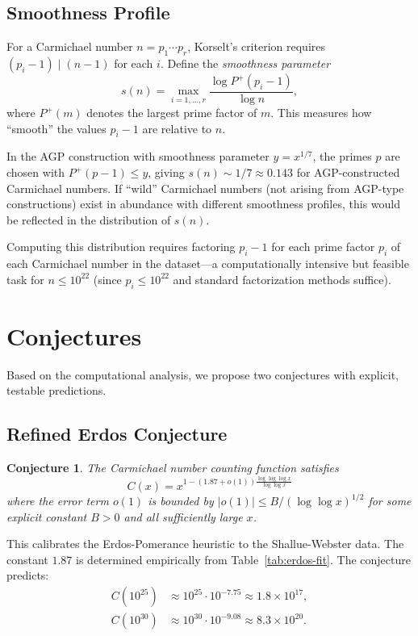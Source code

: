 \documentclass{amsart}
\theoremstyle{plain}
\newtheorem{conjecture}[theorem]{Conjecture}
\theoremstyle{definition}
\theoremstyle{remark}
\begin{document}
\subsection{Smoothness Profile}

For a Carmichael number $n = p_1 \cdots p_r$, Korselt's criterion requires $(p_i - 1) \mid (n-1)$ for each $i$. Define the \emph{smoothness parameter}
\[
s(n) = \max_{i=1,\ldots,r} \frac{\log P^+(p_i - 1)}{\log n},
\]
where $P^+(m)$ denotes the largest prime factor of $m$. This measures how ``smooth'' the values $p_i - 1$ are relative to $n$.

In the AGP construction with smoothness parameter $y = x^{1/7}$, the primes $p$ are chosen with $P^+(p-1) \le y$, giving $s(n) \sim 1/7 \approx 0.143$ for AGP-constructed Carmichael numbers. If ``wild'' Carmichael numbers (not arising from AGP-type constructions) exist in abundance with different smoothness profiles, this would be reflected in the distribution of $s(n)$.

Computing this distribution requires factoring $p_i - 1$ for each prime factor $p_i$ of each Carmichael number in the dataset---a computationally intensive but feasible task for $n \le 10^{22}$ (since $p_i \le 10^{22}$ and standard factorization methods suffice).

\section{Conjectures}\label{sec:conjectures}

Based on the computational analysis, we propose two conjectures with explicit, testable predictions.

\subsection{Refined Erdos Conjecture}

\begin{conjecture}\label{conj:refined-erdos}
The Carmichael number counting function satisfies
\[
C(x) = x^{1 - (1.87 + o(1)) \frac{\log \log \log x}{\log \log x}}
\]
where the error term $o(1)$ is bounded by $|o(1)| \le B / (\log \log x)^{1/2}$ for some explicit constant $B > 0$ and all sufficiently large $x$.
\end{conjecture}

This calibrates the Erdos-Pomerance heuristic to the Shallue-Webster data. The constant $1.87$ is determined empirically from Table~\ref{tab:erdos-fit}. The conjecture predicts:
\begin{align*}
C(10^{25}) &\approx 10^{25} \cdot 10^{-7.75} \approx 1.8 \times 10^{17}, \\
C(10^{30}) &\approx 10^{30} \cdot 10^{-9.08} \approx 8.3 \times 10^{20}.
\end{align*}
\end{document}
